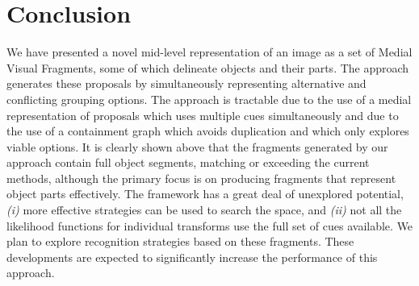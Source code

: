 \section{Conclusion}
We have presented a novel mid-level representation of an image as a set of Medial Visual Fragments, some of which delineate objects and their parts. The approach generates these proposals by simultaneously representing alternative and conflicting grouping  options. The approach is tractable due to the use of a medial representation of proposals which uses multiple cues simultaneously and due to the use of a containment graph which avoids duplication and which only explores viable options. It is clearly shown above that the fragments generated by our approach contain full object segments, matching or exceeding the current methods, although the primary focus is on producing fragments that represent object parts effectively. The framework has a great deal of unexplored potential, \textit{(i) } more effective strategies can be used to search the space, and \textit{(ii)} not all the likelihood functions for individual transforms use the full set of cues available. We plan to explore recognition strategies based on these fragments. These developments are expected to significantly increase the performance of this approach.
 

%  


